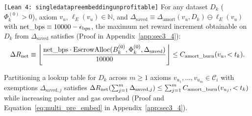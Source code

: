 \documentclass[runningheads,a4paper]{llncs}
\renewcommand{\_}{\textunderscore\allowbreak}
\newcommand{\leanref}[1]{{\footnotesize\texttt{[Lean 4: #1]}}}
\begin{document}
\begin{lemma}
\label{lem:single_data_pre_embed}
\leanref{single\_data\_pre\_embedding\_unprofitable}
For any dataset $D_k$ ($\Phi_k^{(0)} > 0$), axiom $v_u$, $\ell_E(v_u) \in \mathbb{N}$, and $\Delta_{\text{saved}} \equiv \Delta_{\text{amort}}(v_u,\allowbreak D_k) \ominus \ell_E(v_u)$ with $\text{net\_bps} \equiv 10000 - \epsilon_{\text{bps}}$, the maximum net reward increment obtainable on $D_k$ from $\Delta_{\text{saved}}$ satisfies (Proof in Appendix~\ref{app:sec3_4}):
\begin{equation}
\label{eq:delta_r_net}
\Delta R_{\text{net}} \equiv \left\lfloor \frac{\text{net\_bps} \cdot \text{EscrowAlloc}(B_k^{(0)}, \Phi_k^{(0)}, \Delta_{\text{saved}})}{10000} \right\rfloor \le C_{\text{amort\_burn}}(v_u, < t_k).
\end{equation}
\end{lemma}

\begin{corollary}
\label{cor:multi_axiom_pre_embed}
Partitioning a lookup table for $D_k$ across $m \ge 1$ axioms $v_{u_1},\allowbreak \dots,\allowbreak v_{u_m} \in \mathcal{C}_i$ with exemptions $\Delta_{\text{saved},j}$ satisfies $\Delta R_{\text{net}}(\sum_{j=1}^m \Delta_{\text{saved},j}) \le \sum_{j=1}^m C_{\text{amort\_burn}}(v_{u_j},\allowbreak < t_k)$ while increasing pointer and gas overhead (Proof and Equation~\eqref{eq:multi_pre_embed} in Appendix~\ref{app:sec3_4}).
\end{corollary}
\end{document}
